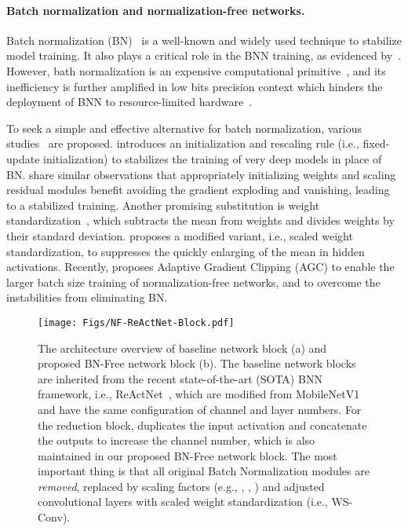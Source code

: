 \documentclass[final]{cvpr}
\begin{document}
\paragraph{Batch normalization and normalization-free networks.} Batch normalization (BN)~\cite{ioffe2015batch} is a well-known and widely used technique to stabilize model training. It also plays a critical role in the BNN training, as evidenced by~\cite{santurkar2018does}. However, bath normalization is an expensive computational primitive~\cite{gitman2017comparison}, and its inefficiency is further amplified in low bits precision context which hinders the deployment of BNN to resource-limited hardware~\cite{wu2018l1}.

To seek a simple and effective alternative for batch normalization, various studies~\cite{zhang2019fixup,bachlechner2020rezero,hanin2018start,qiao2019micro,brock2021characterizing,brock2021agc} are proposed. \cite{zhang2019fixup} introduces an initialization and rescaling rule (i.e., fixed-update initialization) to stabilizes the training of very deep models in place of BN. \cite{bachlechner2020rezero,hanin2018start} share similar observations that appropriately initializing weights and scaling residual modules benefit avoiding the gradient exploding and vanishing, leading to a stabilized training. Another promising substitution is weight standardization~\cite{qiao2019micro}, which subtracts the mean from weights and divides weights by their standard deviation. \cite{brock2021characterizing} proposes a modified variant, i.e., scaled weight standardization, to suppresses the quickly enlarging of the mean in hidden activations. Recently, \cite{brock2021agc} proposes Adaptive Gradient Clipping (AGC) to enable the larger batch size training of normalization-free networks, and to overcome the instabilities from eliminating BN.



\begin{figure*}[t] 
\centering
\texttt{[image: Figs/NF-ReActNet-Block.pdf]}
\caption{The architecture overview of baseline network block (a) and proposed BN-Free network block (b). The baseline network blocks are inherited from the recent state-of-the-art (SOTA) BNN framework, i.e., ReActNet~\cite{liu2020reactnet}, which are modified from MobileNetV1~\cite{howard2017mobilenets} and have the same configuration of channel and layer numbers. For the reduction block, \cite{liu2020reactnet} duplicates the input activation and concatenate the outputs to increase the channel number, which is also maintained in our proposed BN-Free network block. The most important thing is that all original Batch Normalization modules are \textit{removed}, replaced by scaling factors (e.g., , , ) and adjusted convolutional layers with scaled weight standardization (i.e., WS-Conv).}
\label{fig:bfblock}
\end{figure*}
\end{document}
